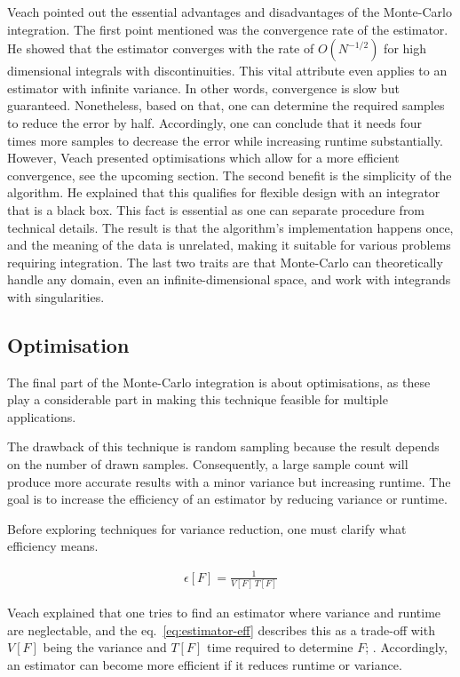 Veach \cite{veach_robust_1997} pointed out the essential advantages and disadvantages of the Monte-Carlo integration.
The first point mentioned was the convergence rate of the estimator.
He showed that the estimator converges with the rate of $O(N^{-1/2})$ for high dimensional integrals with discontinuities.
This vital attribute even applies to an estimator with infinite variance.
In other words, convergence is slow but guaranteed.
Nonetheless, based on that, one can determine the required samples to reduce the error by half.
Accordingly, one can conclude that it needs four times more samples to decrease the error while increasing runtime substantially.
However, Veach presented optimisations which allow for a more efficient convergence, see the upcoming section.
The second benefit is the simplicity of the algorithm.
He explained that this qualifies for flexible design with an integrator that is a black box.
This fact is essential as one can separate procedure from technical details.
The result is that the algorithm's implementation happens once, and the meaning of the data is unrelated, making it suitable for various problems requiring integration.
The last two traits are that Monte-Carlo can theoretically handle any domain, even an infinite-dimensional space, and work with integrands with singularities.

\subsection*{Optimisation}

The final part of the Monte-Carlo integration is about optimisations, as these play a considerable part in making this technique feasible for multiple applications.

The drawback of this technique is random sampling because the result depends on the number of drawn samples.
Consequently, a large sample count will produce more accurate results with a minor variance but increasing runtime.
The goal is to increase the efficiency of an estimator by reducing variance or runtime.

Before exploring techniques for variance reduction, one must clarify what efficiency means.

\begin{align}
    \epsilon[F]=\frac{1}{V[F]\,T[F]}
    \label{eq:estimator-eff}
\end{align}

Veach explained that one tries to find an estimator where variance and runtime are neglectable, and the eq.~\ref{eq:estimator-eff} describes this as a trade-off with $V[F]$ being the variance and $T[F]$ time required to determine $F$; \cite{veach_robust_1997}.
Accordingly, an estimator can become more efficient if it reduces runtime or variance.

